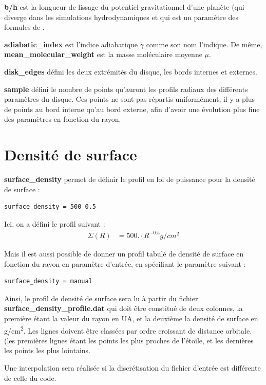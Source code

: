 \textbf{b/h} est la longueur de lissage du potentiel gravitationnel d'une planète (qui diverge dans les simulations hydrodynamiques et qui est un paramètre des formules de \cite{paardekooper2011torque}.

\textbf{adiabatic\_index} est l'indice adiabatique $\gamma$ comme son nom l'indique. De même, \textbf{mean\_molecular\_weight} est la masse moléculaire moyenne $\mu$.

\textbf{disk\_edges} défini les deux extrémités du disque, les bords internes et externes.

\textbf{sample} défini le nombre de points qu'auront les profils radiaux des différents paramètres du disque. Ces points ne sont pas répartis uniformément, il y a plus de points au bord interne qu'au bord externe, afin d'avoir une évolution plus fine des paramètres en fonction du rayon.

\section{Densité de surface}
\textbf{surface\_density} permet de définir le profil en loi de puissance pour la densité de surface : 
\begin{verbatim}
surface_density = 500 0.5
\end{verbatim}
Ici, on a défini le profil suivant : 
\begin{align*}
\Sigma(R) &= 500. \cdot R^{-0.5} \unit{g/cm^2}
\end{align*}

Mais il est aussi possible de donner un profil tabulé de densité de surface en fonction du rayon en paramètre d'entrée, en spécifiant le paramètre suivant : 
\begin{verbatim}
surface_density = manual
\end{verbatim}
Ainsi, le profil de densité de surface sera lu à partir du fichier \textbf{surface\_density\_profile.dat} qui doit être constitué de deux colonnes, la première étant la valeur du rayon en \unit{UA}, et la deuxième la densité de surface en \unit{g/cm^2}. Les lignes doivent être classées par ordre croissant de distance orbitale. (les premières lignes étant les points les plus proches de l'étoile, et les dernières les points les plus lointains. 

\begin{remarque}
Une interpolation sera réalisée si la discrétisation du fichier d'entrée est différente de celle du code.
\end{remarque}

